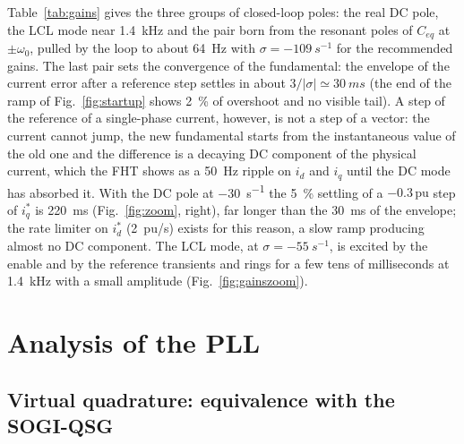 \documentclass[10pt,a4paper]{scrartcl}
\newcommand{\wo}{\omega_0}
\newcommand{\pu}{\,\mathrm{pu}}
\newcommand{\Ceq}{C_{eq}}
\begin{document}
\begin{onehalfspace}
Table~\ref{tab:gains} gives the three groups of closed-loop poles: the real DC pole, the LCL mode near \SI{1.4}{kHz} and the pair born from the resonant poles of $\Ceq$ at $\pm\wo$, pulled by the loop to about \SI{64}{Hz} with $\sigma = \SI{-109}{s^{-1}}$ for the recommended gains. The last pair sets the convergence of the fundamental: the envelope of the current error after a reference step settles in about $3/|\sigma| \simeq \SI{30}{ms}$ (the end of the ramp of Fig.~\ref{fig:startup} shows \SI{2}{\percent} of overshoot and no visible tail). A step of the reference of a single-phase current, however, is not a step of a vector: the current cannot jump, the new fundamental starts from the instantaneous value of the old one and the difference is a decaying DC component of the physical current, which the FHT shows as a \SI{50}{Hz} ripple on $i_d$ and $i_q$ until the DC mode has absorbed it. With the DC pole at \SI{-30}{s^{-1}} the \SI{5}{\percent} settling of a $-0.3\pu$ step of $i_q^*$ is \SI{220}{ms} (Fig.~\ref{fig:zoom}, right), far longer than the \SI{30}{ms} of the envelope; the rate limiter on $i_d^*$ (\SI{2}{pu/s}) exists for this reason, a slow ramp producing almost no DC component. The LCL mode, at $\sigma = \SI{-55}{s^{-1}}$, is excited by the enable and by the reference transients and rings for a few tens of milliseconds at \SI{1.4}{kHz} with a small amplitude (Fig.~\ref{fig:gainszoom}).

\section{Analysis of the PLL}
\label{sec:pll}

\subsection{Virtual quadrature: equivalence with the SOGI-QSG}
\label{sec:sogi}


\end{onehalfspace}
\end{document}
